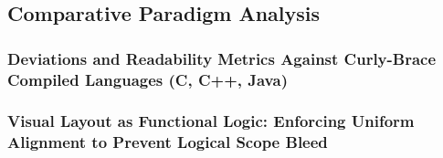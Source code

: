 \subsection{Comparative Paradigm Analysis}
\subsubsection{Deviations and Readability Metrics Against Curly-Brace Compiled Languages (C, C++, Java)}
\subsubsection{Visual Layout as Functional Logic: Enforcing Uniform Alignment to Prevent Logical Scope Bleed}
